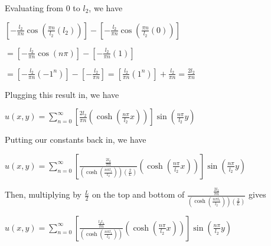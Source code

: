 \documentclass[executivepaper]{article}
\begin{document}
\begin{flushleft}
\begin{center}
\end{center}

Evaluating from $0$ to $l_{2}$, we have

\begin{center}

$\left[-\frac{l_{2}}{\pi n} \cos\left(\frac{\pi n}{l_{2}} \left(l_{2}\right)\right)\right]-\left[-\frac{l_{2}}{\pi n} \cos\left(\frac{\pi n}{l_{2}} (0)\right)\right]$

\vspace{2mm}

$=\left[-\frac{l_{2}}{\pi n} \cos\left(n \pi \right)\right]-\left[-\frac{l_{2}}{\pi n} (1)\right]$

\vspace{2mm}

$=\left[-\frac{l_{2}}{\pi n} \left(-1^{n} \right)\right]-\left[-\frac{l_{2}}{\pi n}\right]=\left[\frac{l_{2}}{\pi n} \left(1^{n} \right)\right]+\frac{l_{2}}{\pi n}=\frac{2 l_{2}}{\pi n}$

\end{center}

Plugging this result in, we have

\begin{center}

$u(x,y)=\sum_{n=0}^{\infty} \left[\frac{2 l_{2}}{\pi n} \left(\cosh\left(\frac{n \pi}{l_{2}} x\right)\right)\right] \sin\left(\frac{n \pi}{l_{2}} y\right)$

\end{center}

Putting our constants back in, we have

\begin{center}

$u(x,y)=\sum_{n=0}^{\infty} \left[\frac{\frac{2 l_{2}}{\pi n}}{\left(\cosh\left(\frac{n \pi l_{1}}{l_{2}}\right)\right)\left(\frac{2}{L}\right)} \left(\cosh\left(\frac{n \pi}{l_{2}} x\right)\right)\right] \sin\left(\frac{n \pi}{l_{2}} y\right)$

\end{center}

Then, multiplying by $\frac{L}{2}$ on the top and bottom of $\frac{\frac{2 l_{2}}{\pi n}}{\left(\cosh\left(\frac{n \pi l_{1}}{l_{2}}\right)\right)\left(\frac{2}{L}\right)}$ gives

\begin{center}

$u(x,y)=\sum_{n=0}^{\infty} \left[\frac{\frac{l_{2} l_{1}}{\pi n}}{\left(\cosh\left(\frac{n \pi l_{1}}{l_{2}}\right)\right)} \left(\cosh\left(\frac{n \pi}{l_{2}} x\right)\right)\right] \sin\left(\frac{n \pi}{l_{2}} y\right)$

\end{center}

\end{flushleft}
\end{document}
